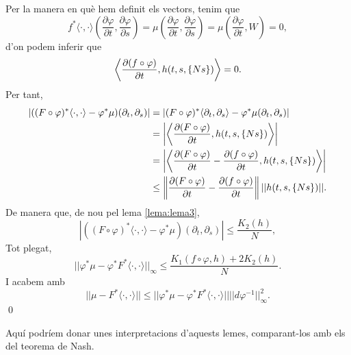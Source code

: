 {Per la manera en què hem definit els vectors, tenim que 
\begin{equation*}
    f^*\langle\cdot, \cdot\rangle\left(\frac{\partial\varphi}{\partial t},\frac{\partial\varphi}{\partial s}\right) = \mu\left(\frac{\partial\varphi}{\partial t},\frac{\partial\varphi}{\partial s}\right) = \mu\left(\frac{\partial\varphi}{\partial t},W\right) = 0,
\end{equation*}
d'on podem inferir que 
\begin{equation*}
    \left\langle \frac{\partial(f\circ\varphi)}{\partial t}, h(t,s,\{Ns\})\right\rangle = 0.
\end{equation*}
Per tant,
\begin{align*}
    |((F\circ\varphi)^*\langle\cdot,\cdot\rangle-\varphi^*\mu)(\partial_t,\partial_s)| &= |(F\circ\varphi)^*\langle\partial_t,\partial_s\rangle - \varphi^*\mu(\partial_t,\partial_s)|
    \\
    &= \left|\left\langle \frac{\partial(F\circ\varphi)}{\partial t}, h(t,s,\{Ns\}) \right\rangle\right|
    \\
    &= \left|\left\langle \frac{\partial(F\circ\varphi)}{\partial t}-\frac{\partial(f\circ\varphi)}{\partial t}, h(t,s,\{Ns\}) \right\rangle\right|
    \\
    &\le \left\| \frac{\partial(F\circ\varphi)}{\partial t} -\frac{\partial(f\circ\varphi)}{\partial t}\right\|||h(t,s,\{Ns\})||.
\end{align*}
De manera que, de nou pel lema \ref{lema:lema3},
\begin{equation}\label{eq:cosa_K2}
    |((F\circ\varphi)^*\langle\cdot,\cdot\rangle-\varphi^*\mu)(\partial_t,\partial_s)| \le \frac{K_2(h)}{N},
\end{equation}
Tot plegat, 
\begin{equation*}
    ||\varphi^*\mu - \varphi^*F^*\langle\cdot,\cdot\rangle||_\infty \le \frac{K_1(f\circ \varphi, h) + 2K_2(h)}{N}.
\end{equation*}
I acabem amb 
\begin{equation*}
    ||\mu-F^*\langle\cdot,\cdot\rangle|| \le ||\varphi^*\mu - \varphi^*F^*\langle\cdot,\cdot\rangle|| ||d\varphi^{-1}||^2_\infty.
\end{equation*}
\qed
}





{
\color{blue}
\begin{obs}
    Aquí podríem donar unes interpretacions d'aquests lemes, comparant-los amb els del teorema de Nash.
\end{obs}
}
    
